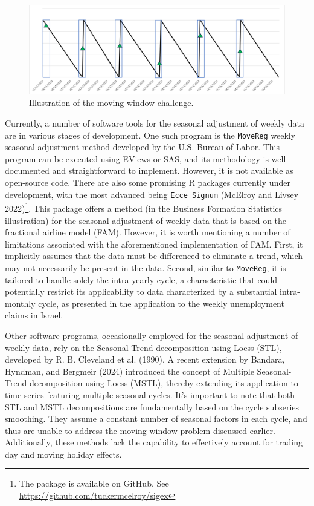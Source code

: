 \begin{figure}[H]

{\centering \includegraphics[width=1\linewidth,]{figures/mov-window-problem} 

}

\caption{Illustration of the moving window challenge.}\label{fig:mov-window-problem}
\end{figure}

Currently, a number of software tools for the seasonal adjustment of weekly data are in various stages of development. One such program is the \texttt{MoveReg} weekly seasonal adjustment method developed by the U.S. Bureau of Labor. This program can be executed using EViews or SAS, and its methodology is well documented and straightforward to implement. However, it is not available as open-source code. There are also some promising R packages currently under development, with the most advanced being \texttt{Ecce\ Signum} (McElroy and Livsey 2022)\footnote{The package is available on GitHub. See \url{https://github.com/tuckermcelroy/sigex}}. This package offers a method (in the Business Formation Statistics illustration) for the seasonal adjustment of weekly data that is based on the fractional airline model (FAM). However, it is worth mentioning a number of limitations associated with the aforementioned implementation of FAM. First, it implicitly assumes that the data must be differenced to eliminate a trend, which may not necessarily be present in the data. Second, similar to \texttt{MoveReg}, it is tailored to handle solely the intra-yearly cycle, a characteristic that could potentially restrict its applicability to data characterized by a substantial intra-monthly cycle, as presented in the application to the weekly unemployment claims in Israel.

Other software programs, occasionally employed for the seasonal adjustment of weekly data, rely on the Seasonal-Trend decomposition using Loess (STL), developed by R. B. Cleveland et al. (1990). A recent extension by Bandara, Hyndman, and Bergmeir (2024) introduced the concept of Multiple Seasonal-Trend decomposition using Loess (MSTL), thereby extending its application to time series featuring multiple seasonal cycles. It's important to note that both STL and MSTL decompositions are fundamentally based on the cycle subseries smoothing. They assume a constant number of seasonal factors in each cycle, and thus are unable to address the moving window problem discussed earlier. Additionally, these methods lack the capability to effectively account for trading day and moving holiday effects.

